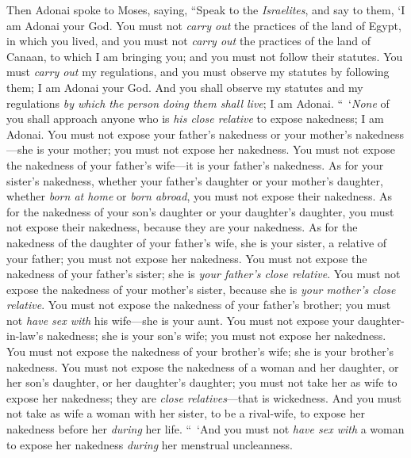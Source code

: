 \begin{biblechapter} %
 Then Adonai spoke to Moses, saying,
\verse “Speak to the \textit{Israelites}, and say to them, ‘I am Adonai your God.
\verse You must not \textit{carry out} the practices of the land of Egypt, in which you lived, and you must not \textit{carry out} the practices of the land of Canaan, to which I am bringing you; and you must not follow their statutes.
\verse You must \textit{carry out} my regulations, and you must observe my statutes by following them; I am Adonai your God.
\verse And you shall observe my statutes and my regulations \textit{by which the person doing them shall live}; I am Adonai.
\verse “ ‘\textit{None} of you shall approach anyone who is \textit{his close relative} to expose nakedness; I am Adonai.
\verse You must not expose your father’s nakedness or your mother’s nakedness—she is your mother; you must not expose her nakedness.
\verse You must not expose the nakedness of your father’s wife—it is your father’s nakedness.
\verse As for your sister’s nakedness, whether your father’s daughter or your mother’s daughter, whether \textit{born at home} or \textit{born abroad}, you must not expose their nakedness.
\verse As for the nakedness of your son’s daughter or your daughter’s daughter, you must not expose their nakedness, because they are your nakedness.
\verse As for the nakedness of the daughter of your father’s wife, she is your sister, a relative of your father; you must not expose her nakedness.
\verse You must not expose the nakedness of your father’s sister; she is \textit{your father’s close relative}.
\verse You must not expose the nakedness of your mother’s sister, because she is \textit{your mother’s close relative}.
\verse You must not expose the nakedness of your father’s brother; you must not \textit{have sex with} his wife—she is your aunt.
\verse You must not expose your daughter-in-law’s nakedness; she is your son’s wife; you must not expose her nakedness.
\verse You must not expose the nakedness of your brother’s wife; she is your brother’s nakedness.
\verse You must not expose the nakedness of a woman and her daughter, or her son’s daughter, or her daughter’s daughter; you must not take her as wife to expose her nakedness; they are \textit{close relatives}—that is wickedness.
\verse And you must not take as wife a woman with her sister, to be a rival-wife, to expose her nakedness before her \textit{during} her life.
\verse “ ‘And you must not \textit{have sex with} a woman to expose her nakedness \textit{during} her menstrual uncleanness.

\end{biblechapter}
